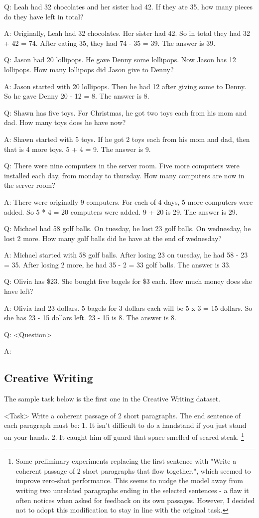 \documentclass[11pt]{article}
\begin{document}
Q: Leah had 32 chocolates and her sister had 42. If they ate 35, how many pieces do they have left in total?

A: Originally, Leah had 32 chocolates. Her sister had 42. So in total they had 32 + 42 = 74. After eating 35, they
had 74 - 35 = 39. The answer is 39.

Q: Jason had 20 lollipops. He gave Denny some lollipops. Now Jason has 12 lollipops. How many lollipops did
Jason give to Denny?

A: Jason started with 20 lollipops. Then he had 12 after giving some to Denny. So he gave Denny 20 - 12 = 8.
The answer is 8.

Q: Shawn has five toys. For Christmas, he got two toys each from his mom and dad. How many toys does he
have now?

A: Shawn started with 5 toys. If he got 2 toys each from his mom and dad, then that is 4 more toys. 5 + 4 = 9.
The answer is 9.

Q: There were nine computers in the server room. Five more computers were installed each day, from monday
to thursday. How many computers are now in the server room?

A: There were originally 9 computers. For each of 4 days, 5 more computers were added. So 5 * 4 = 20
computers were added. 9 + 20 is 29. The answer is 29.

Q: Michael had 58 golf balls. On tuesday, he lost 23 golf balls. On wednesday, he lost 2 more. How many golf
balls did he have at the end of wednesday?

A: Michael started with 58 golf balls. After losing 23 on tuesday, he had 58 - 23 = 35. After losing 2 more, he
had 35 - 2 = 33 golf balls. The answer is 33.

Q: Olivia has \$23. She bought five bagels for \$3 each. How much money does she have left?

A: Olivia had 23 dollars. 5 bagels for 3 dollars each will be 5 x 3 = 15 dollars. So she has 23 - 15 dollars left. 23
- 15 is 8. The answer is 8.

Q: <Question>

A:

\subsection{Creative Writing}

The sample task below is the first one in the Creative Writing dataset. \cite{yao_tree_2023}

<Task> Write a coherent passage of 2 short paragraphs. The end sentence of each paragraph must be: 1. It isn't difficult to do a handstand if you just stand on your hands. 2. It caught him off guard that space smelled of seared steak. \footnote{Some preliminary experiments replacing the first sentence with "Write a coherent passage of 2 short paragraphs that flow together.", which seemed to improve zero-shot performance. This seems to nudge the model away from writing two unrelated paragraphs ending in the selected sentences - a flaw it often notices when asked for feedback on its own passages. However, I decided not to adopt this modification to stay in line with the original task.}
\end{document}
